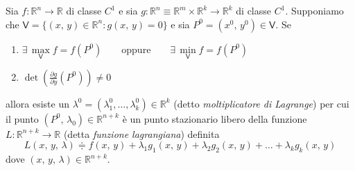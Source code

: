 \begin{thm}
Sia $f : \mathbb{R}^n \longrightarrow \mathbb{R}$  di classe $C^1$ e sia $g: \mathbb{R}^n \equiv \mathbb{R}^m \times \mathbb{R}^k \longrightarrow \mathbb{R}^k$ di classe $C^1$. Supponiamo che $\mathsf{V} = \lbrace (x,\,y) \in \mathbb{R}^n : g(x,\,y) = 0 \rbrace$ e sia $P^0 = (x^0,\,y^0) \in \mathsf{V}$. Se
\begin{enumerate}[labelindent=\parindent,leftmargin=*,label=\textnormal{(\roman*)},start=1]
\item $\exists \, \underset{\mathsf{V}}{\max} f = f(P^0) \qquad \text{oppure} \qquad \exists \, \underset{\mathsf{V}}{\min} f = f(P^0)$
\item $\det \left( \frac{\partial g}{\partial y}(P^0) \right) \neq 0$
\end{enumerate}
allora esiste un $\lambda^0 = (\lambda_1^0,\ldots,\lambda_k^0) \in \mathbb{R}^k$ (detto \emph{moltiplicatore di Lagrange}) per cui il punto $(P^0,\,\lambda_0) \in \mathbb{R}^{n+k}$ è un punto stazionario libero della funzione $L : \mathbb{R}^{n+k} \longrightarrow \mathbb{R}$ (detta \emph{funzione lagrangiana}) definita
$$
L(x,\,y,\,\lambda) \doteqdot f(x,\,y) + \lambda_1 g_1(x,\,y) + \lambda_2 g_2(x,\,y) + \ldots + \lambda_k g_k(x,\,y)$$
dove $(x,\,y,\,\lambda) \in \mathbb{R}^{n+k}$.
\end{thm}
